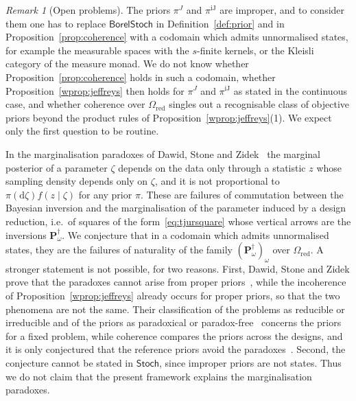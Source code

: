 \documentclass[11pt,a4paper]{article}
\theoremstyle{plain}
\theoremstyle{definition}
\theoremstyle{remark}
\newtheorem{remark}[theorem]{Remark}
\newcommand{\cat}[1]{\mathsf{#1}}
\newcommand{\catO}{\cat{\Omega}}
\newcommand{\Stoch}{\cat{Stoch}}
\newcommand{\BorelStoch}{\cat{BorelStoch}}
\begin{document}
\begin{remark}[Open problems]\label{rem:open}
The priors $\pi^{J}$ and $\pi^{\mathrm{iJ}}$ are improper, and to consider them
one has to replace $\BorelStoch$ in Definition~\ref{def:prior} and in
Proposition~\ref{prop:coherence} with a codomain which admits unnormalised
states, for example the measurable spaces with the $s$-finite kernels, or the
Kleisli category of the measure monad. We do not know whether
Proposition~\ref{prop:coherence} holds in such a codomain, whether
Proposition~\ref{wprop:jeffreys} then holds for $\pi^{J}$ and
$\pi^{\mathrm{iJ}}$ as stated in the continuous case, and whether coherence
over $\catO_{\mathrm{red}}$ singles out a recognisable class of objective
priors beyond the product rules of Proposition~\ref{wprop:jeffreys}(1). We
expect only the first question to be routine.

In the marginalisation paradoxes of Dawid, Stone and
Zidek~\cite[\S1 and Thm.~2.1, p.~198]{dawid_stone_zidek_1973} the marginal
posterior of a parameter $\zeta$ depends on the data only through a statistic
$z$ whose sampling density depends only on $\zeta$, and it is not proportional
to $\pi(\mathrm{d}\zeta)f(z\mid\zeta)$ for any prior $\pi$. These are failures of
commutation between the Bayesian inversion and the marginalisation of the
parameter induced by a design reduction, i.e.\ of squares of the
form~\eqref{eq:tjursquare} whose vertical arrows are the inversions
$\mathbf P^{\dagger}_{\omega}$. We conjecture that in a codomain which admits
unnormalised states, they are the failures of naturality of the family
$(\mathbf P^{\dagger}_{\omega})_{\omega}$ over $\catO_{\mathrm{red}}$. A
stronger statement is not possible, for two reasons. First, Dawid, Stone and
Zidek prove that the paradoxes cannot arise from proper
priors~\cite[p.~189 and p.~194, eqs.~(1.20)--(1.23)]{dawid_stone_zidek_1973},
while the incoherence of Proposition~\ref{wprop:jeffreys} already occurs for
proper priors, so that the two phenomena are not the same. Their
classification of the problems as reducible or irreducible and of the priors
as paradoxical or
paradox-free~\cite[p.~208]{dawid_stone_zidek_1973} concerns the priors for a
fixed problem, while coherence compares the priors across the designs, and it
is only conjectured that the reference priors avoid the
paradoxes~\cite[p.~123]{bernardo_reference_1979}. Second, the conjecture
cannot be stated in $\Stoch$, since improper priors are not states. Thus we do
not claim that the present framework explains the marginalisation paradoxes.
\end{remark}
\end{document}
